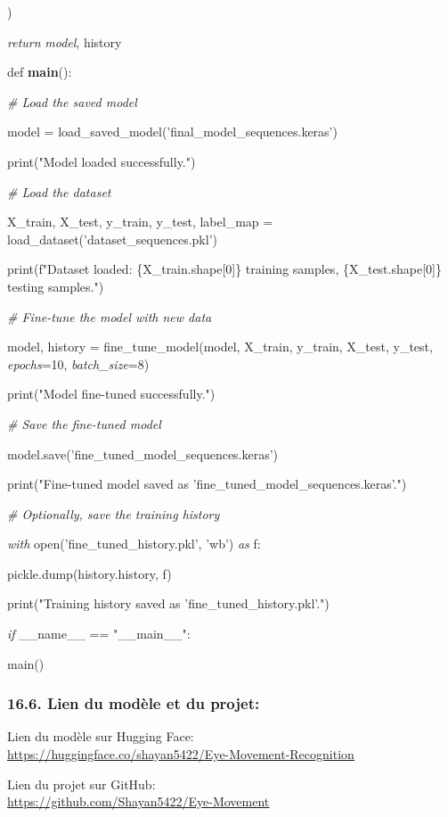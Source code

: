 \documentclass[
]{article}
\begin{document}
)

\emph{return} \emph{model}, history

def \textbf{main}():

\emph{\# Load the saved model}

model = load\_saved\_model('final\_model\_sequences.keras')

print("Model loaded successfully.")

\emph{\# Load the dataset}

X\_train, X\_test, y\_train, y\_test, label\_map = load\_dataset('dataset\_sequences.pkl')

print(f"Dataset loaded: \{X\_train.shape{[}0{]}\} training samples, \{X\_test.shape{[}0{]}\} testing samples.")

\emph{\# Fine-tune the model with new data}

model, history = fine\_tune\_model(model, X\_train, y\_train, X\_test, y\_test, \emph{epochs}=10, \emph{batch\_size}=8)

print("Model fine-tuned successfully.")

\emph{\# Save the fine-tuned model}

model.save('fine\_tuned\_model\_sequences.keras')

print("Fine-tuned model saved as 'fine\_tuned\_model\_sequences.keras'.")

\emph{\# Optionally, save the training history}

\emph{with} open('fine\_tuned\_history.pkl', 'wb') \emph{as} f:

pickle.dump(history.history, f)

print("Training history saved as 'fine\_tuned\_history.pkl'.")

\emph{if} \_\_name\_\_ == "\_\_main\_\_":

main()

\hypertarget{lien-du-moduxe8le-et-du-projet}{%
\subsubsection{16.6. Lien du modèle et du projet:}\label{lien-du-moduxe8le-et-du-projet}}

Lien du modèle sur Hugging Face:\\
\href{https://huggingface.co/shayan5422/Eye-Movement-Recognition}{\underline{https://huggingface.co/shayan5422/Eye-Movement-Recognition}}

Lien du projet sur GitHub:\\
\href{https://github.com/Shayan5422/Eye-Movement}{\underline{https://github.com/Shayan5422/Eye-Movement}}
\end{document}
